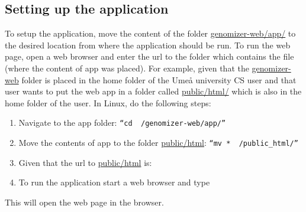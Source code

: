 \subsection{Setting up the application}
To setup the application, move the content of the folder \url{genomizer-web/app/} to the desired location from where the application should be run. To run the web page, open a web browser and enter the url to the folder which contains the  file (where the content of app was placed).
For example, given that the \url{genomizer-web} folder is placed in the home folder of the Umeå university CS user  and that user wants to put the web app in a folder called \url{public/html/} which is also in the home folder of the user. In Linux, do the following steps:
\begin{enumerate}
	\item Navigate to the app folder: \texttt{“cd ~/genomizer-web/app/”}
	\item Move the contents of app to the folder \url{public/html}: \texttt{“mv * ~/public\_html/”}
	\item Given that the url to \url{public/html} is: 
	\item To run the application start a web browser and type 
\end{enumerate}
This will open the web page in the browser.


